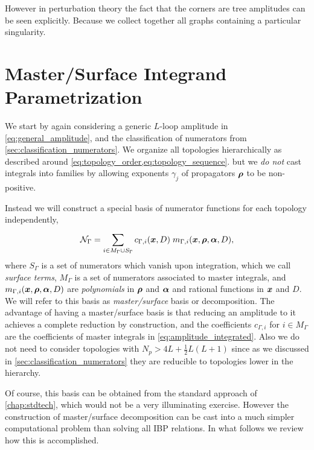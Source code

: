 However in perturbation theory the fact that the corners are tree amplitudes can be seen explicitly.
Because we collect together all graphs containing a particular singularity.

\section{Master/Surface Integrand Parametrization}
\label{sec:ansatz_integrand}

We start by again considering a generic $L$-loop amplitude in \cref{eq:general_amplitude},
and  the classification of numerators from \cref{sec:classification_numerators}.
We organize all topologies hierarchically as described around \cref{eq:topology_order,eq:topology_sequence}.
but we \emph{do not} cast integrals into families by allowing exponents $\gamma_j$ of propagators $\vb*{\rho}$ to be non-positive.

Instead we will construct a special basis of numerator functions for each topology independently,
\begin{equation} \label{eq:master_surface_basis}
  \mathcal{N}_\Gamma = \sum_{i \in M_\Gamma \cup S_\Gamma}^{} c_{\Gamma, i}(\vb*{x},D) \; m_{\Gamma, i} (\vb*{x},\vb*{\rho},\vb*{\alpha},D),
\end{equation}
where $S_\Gamma$ is a set of numerators which vanish upon integration, which we call \emph{surface terms}, $M_\Gamma$ is a set of numerators associated to master integrals, and
$m_{\Gamma, i} (\vb*{x},\vb*{\rho},\vb*{\alpha},D)$ are \emph{polynomials} in $\vb*{\rho}$ and $\vb*{\alpha}$ and rational functions in $\vb*{x}$ and $D$.
We will refer to this basis as \emph{master/surface} basis or decomposition.
The advantage of having a master/surface basis is that
reducing an amplitude to it achieves
a complete reduction by construction,
and the coefficients $c_{\Gamma,i}$ for $i\in M_\Gamma$ are the coefficients
of master integrals in \cref{eq:amplitude_integrated}.
Also we do not need to consider topologies with $N_p > 4L + \frac{1}{2}L(L+1)$ since as we discussed in \cref{sec:classification_numerators}
they are reducible to topologies lower in the hierarchy.

Of course, this basis can be obtained from the standard approach of \cref{chap:stdtech}, which would not be a very illuminating exercise.
However the construction of master/surface decomposition can be cast into a much simpler computational problem than solving all IBP relations.
In what follows we review how this is accomplished.


